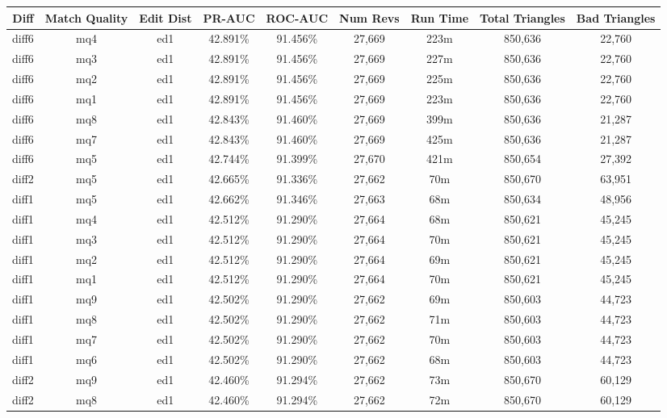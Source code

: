 \begin{sidewaystable}[!ph]
  \begin{center}
    \begin{tabular}{|c|c|c||c|c||c|c|c|c|}
\hline
Diff & Match Quality & Edit Dist
        & PR-AUC & ROC-AUC
        & Num Revs & Run Time
        & Total Triangles & Bad Triangles \\
\hline
\hline
diff6 & mq4 & ed1 & 42.891\% & 91.456\% & 27,669 & 223m & 850,636 & 22,760 \\
diff6 & mq3 & ed1 & 42.891\% & 91.456\% & 27,669 & 227m & 850,636 & 22,760 \\
diff6 & mq2 & ed1 & 42.891\% & 91.456\% & 27,669 & 225m & 850,636 & 22,760 \\
diff6 & mq1 & ed1 & 42.891\% & 91.456\% & 27,669 & 223m & 850,636 & 22,760 \\
diff6 & mq8 & ed1 & 42.843\% & 91.460\% & 27,669 & 399m & 850,636 & 21,287 \\
diff6 & mq7 & ed1 & 42.843\% & 91.460\% & 27,669 & 425m & 850,636 & 21,287 \\
diff6 & mq5 & ed1 & 42.744\% & 91.399\% & 27,670 & 421m & 850,654 & 27,392 \\
diff2 & mq5 & ed1 & 42.665\% & 91.336\% & 27,662 & 70m & 850,670 & 63,951 \\
diff1 & mq5 & ed1 & 42.662\% & 91.346\% & 27,663 & 68m & 850,634 & 48,956 \\
diff1 & mq4 & ed1 & 42.512\% & 91.290\% & 27,664 & 68m & 850,621 & 45,245 \\
diff1 & mq3 & ed1 & 42.512\% & 91.290\% & 27,664 & 70m & 850,621 & 45,245 \\
diff1 & mq2 & ed1 & 42.512\% & 91.290\% & 27,664 & 69m & 850,621 & 45,245 \\
diff1 & mq1 & ed1 & 42.512\% & 91.290\% & 27,664 & 70m & 850,621 & 45,245 \\
diff1 & mq9 & ed1 & 42.502\% & 91.290\% & 27,662 & 69m & 850,603 & 44,723 \\
diff1 & mq8 & ed1 & 42.502\% & 91.290\% & 27,662 & 71m & 850,603 & 44,723 \\
diff1 & mq7 & ed1 & 42.502\% & 91.290\% & 27,662 & 70m & 850,603 & 44,723 \\
diff1 & mq6 & ed1 & 42.502\% & 91.290\% & 27,662 & 68m & 850,603 & 44,723 \\
diff2 & mq9 & ed1 & 42.460\% & 91.294\% & 27,662 & 73m & 850,670 & 60,129 \\
diff2 & mq8 & ed1 & 42.460\% & 91.294\% & 27,662 & 72m & 850,670 & 60,129 \\

\end{tabular}
\end{center}
\end{sidewaystable}
